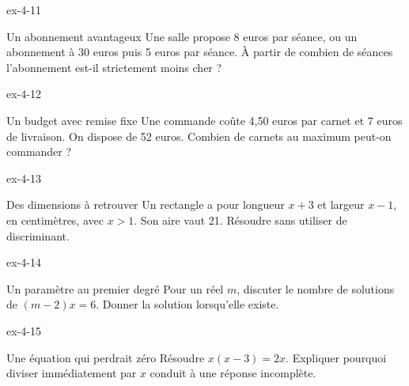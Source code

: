 \clearpage{}
\begin{blocLivre}{ex-4-11}
\begin{exercice}[3]{Un abonnement avantageux}
Une salle propose 8 euros par séance, ou un abonnement à 30 euros puis 5 euros par séance. À partir de combien de séances l’abonnement est-il strictement moins cher ?
\end{exercice}
\end{blocLivre}
\begin{blocLivre}{ex-4-12}
\begin{exercice}[3]{Un budget avec remise fixe}
Une commande coûte 4,50 euros par carnet et 7 euros de livraison. On dispose de 52 euros. Combien de carnets au maximum peut-on commander ?
\end{exercice}
\end{blocLivre}
\begin{blocLivre}{ex-4-13}
\begin{exercice}[3]{Des dimensions à retrouver}
Un rectangle a pour longueur $x+3$ et largeur $x-1$, en centimètres, avec $x>1$. Son aire vaut 21. Résoudre sans utiliser de discriminant.
\label{fig-ex-4-13}
\end{exercice}
\end{blocLivre}
\begin{blocLivre}{ex-4-14}
\begin{exercice}[3]{Un paramètre au premier degré}
Pour un réel $m$, discuter le nombre de solutions de $(m-2)x=6$. Donner la solution lorsqu’elle existe.
\end{exercice}
\end{blocLivre}
\begin{blocLivre}{ex-4-15}
\begin{exercice}[3]{Une équation qui perdrait zéro}
Résoudre $x(x-3)=2x$. Expliquer pourquoi diviser immédiatement par $x$ conduit à une réponse incomplète.
\end{exercice}
\end{blocLivre}

\clearpage
